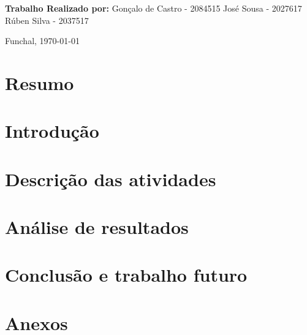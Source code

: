 \documentclass[12pt,a4paper]{article}
\begin{document}
\begin{titlepage}
\begin{multicols}{2}
{                }

                \columnbreak

                \textbf{Trabalho Realizado por:} \newline
                    \-\hspace{3ex}Gonçalo de Castro - 2084515\newline
                    \-\hspace{3ex}José Sousa - 2027617\newline
                    \-\hspace{3ex}Rúben Silva - 2037517\newline
        \end{multicols}

        \vfill  %


        \par{\small
        Funchal, \today
        } %

    \end{titlepage}

    \newpage

    \renewcommand{\contentsname}{Índice} %
    \tableofcontents %

    \newpage

    \justify

    \section{Resumo}
        

    \newpage

    \section{Introdução}
        

    \newpage

    \section{Descrição das atividades}
        

    \newpage

    \section{Análise de resultados}
        

    \newpage


    \section{Conclusão e trabalho futuro}
        

    \newpage


    \section{Anexos}
        
\end{document}
